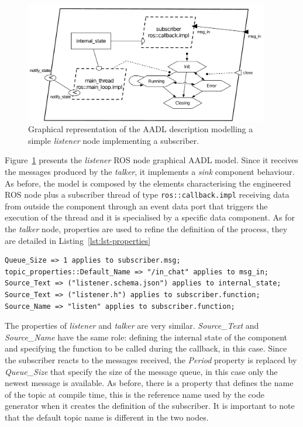 \begin{figure}[t]
\centering
\includegraphics[width=0.95\textwidth]{gfx/usecase-subscriber}
\caption{Graphical representation of the AADL description modelling a simple \textit{listener} node implementing a subscriber.}\label{fig:usecase-subscriber}
\end{figure}

Figure~\ref{fig:usecase-subscriber} presents the \textit{listener} ROS node graphical AADL model. Since it receives the messages produced by the \textit{talker}, it implements a \textit{sink} component behaviour. As before, the model is composed by the elements characterising the engineered ROS node plus a subscriber thread of type \texttt{ros::callback.impl} receiving data from outside the component through an event data port that triggers the execution of the thread and it is specialised by a specific data component. As for the \textit{talker} node, properties are used to refine the definition of the process, they are detailed in Listing~\ref{lst:lst-properties}

\begin{lstlisting}[language=AADL,caption={TODO},label=lst:lst-properties]
Queue_Size => 1 applies to subscriber.msg;
topic_properties::Default_Name => "/in_chat" applies to msg_in;
Source_Text => ("listener.schema.json") applies to internal_state;
Source_Text => ("listener.h") applies to subscriber.function;
Source_Name => "listen" applies to subscriber.function;
\end{lstlisting}

The properties of \textit{listener} and \textit{talker} are very similar. \textit{Source\_Text} and \textit{Source\_Name} have the same role: defining the internal state of the component and specifying the function to be called during the callback, in this case. Since the subscriber reacts to the messages received, the \textit{Period} property is replaced by \textit{Queue\_Size} that specify the size of the message queue, in this case only the newest message is available. As before, there is a property that defines the name of the topic at compile time, this is the reference name used by the code generator when it creates the definition of the subscriber. It is important to note that the default topic name is different in the two nodes.

